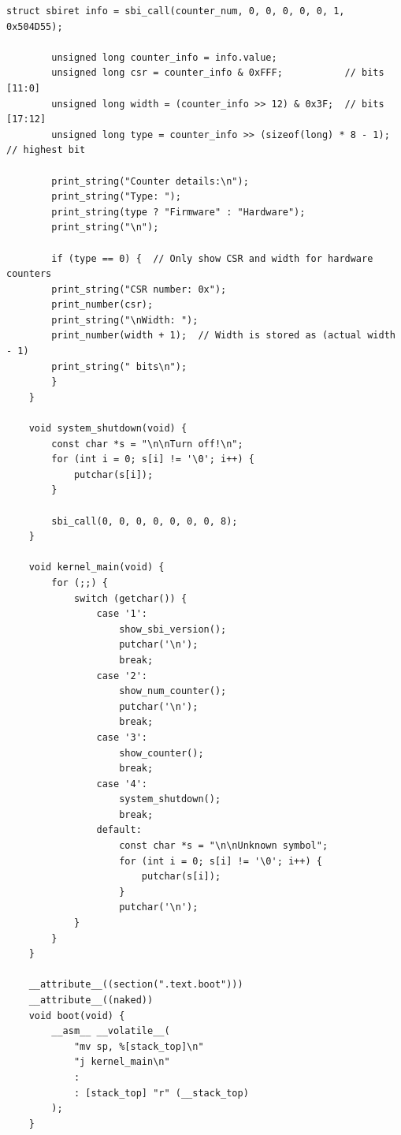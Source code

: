\documentclass{article}
\begin{document}
\begin{lstlisting}[caption={kernel.ld}, label={lst:example}]
        struct sbiret info = sbi_call(counter_num, 0, 0, 0, 0, 0, 1, 0x504D55);

        unsigned long counter_info = info.value;
        unsigned long csr = counter_info & 0xFFF;           // bits [11:0]
        unsigned long width = (counter_info >> 12) & 0x3F;  // bits [17:12]
        unsigned long type = counter_info >> (sizeof(long) * 8 - 1); // highest bit

        print_string("Counter details:\n");
        print_string("Type: ");
        print_string(type ? "Firmware" : "Hardware");
        print_string("\n");
        
        if (type == 0) {  // Only show CSR and width for hardware counters
        print_string("CSR number: 0x");
        print_number(csr);
        print_string("\nWidth: ");
        print_number(width + 1);  // Width is stored as (actual width - 1)
        print_string(" bits\n");
        }
    }

    void system_shutdown(void) {
        const char *s = "\n\nTurn off!\n";
        for (int i = 0; s[i] != '\0'; i++) {
            putchar(s[i]);
        }

        sbi_call(0, 0, 0, 0, 0, 0, 0, 8);
    }

    void kernel_main(void) {
        for (;;) {
            switch (getchar()) {
                case '1':
                    show_sbi_version();
                    putchar('\n');
                    break;
                case '2':
                    show_num_counter();
                    putchar('\n');
                    break;
                case '3':
                    show_counter();
                    break;
                case '4':
                    system_shutdown();
                    break;
                default:
                    const char *s = "\n\nUnknown symbol";
                    for (int i = 0; s[i] != '\0'; i++) {
                        putchar(s[i]);
                    }
                    putchar('\n');
            }
        }
    }

    __attribute__((section(".text.boot")))
    __attribute__((naked))
    void boot(void) {
        __asm__ __volatile__(
            "mv sp, %[stack_top]\n" 
            "j kernel_main\n"      
            :
            : [stack_top] "r" (__stack_top)
        );
    }
\end{lstlisting}
\end{document}
